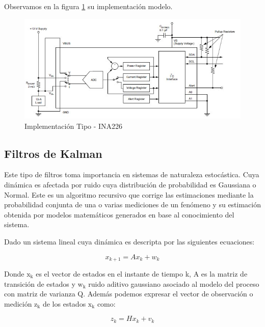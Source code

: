 \documentclass[10pt,a4paper]{article}
\begin{document}
Observamos en la figura \ref{fig:ina226-commonimplementation} su implementación
modelo. 

\begin{figure}[h!]
    \begin{center}
	\includegraphics[width=0.7\linewidth]{assets/INA226-Common_Implementation}
	\caption{Implementación Tipo - INA226}
	\label{fig:ina226-commonimplementation}
    \end{center}	
\end{figure}
\FloatBarrier

\subsection{Filtros de Kalman}

Este tipo de filtros toma importancia en sistemas de naturaleza estocástica.
Cuya dinámica es afectada por ruido cuya distribución de probabilidad es
Gaussiana o Normal. Este es un algoritmo recursivo que corrige las estimaciones
mediante la probabilidad conjunta de una o varias mediciones de un fenómeno y su
estimación obtenida por modelos matemáticos generados en base al conocimiento
del sistema.

Dado un sistema lineal cuya dinámica es descripta por las siguientes ecuaciones:

\begin{equation}
    x_{k+1}= Ax_{k} + w_{k}
    \label{KF_equation01}
\end{equation}	

\noindent Donde $\mathrm{x_{k}}$ es el vector de estados en el instante de 
tiempo k, A es la matriz de transición de estados y $\mathrm{w_{k}}$ ruido 
aditivo gaussiano asociado al modelo del proceso con matriz de varianza Q. 
Además podemos expresar el vector de observación o medición $\mathrm{z_{k}}$ 
de los estados $\mathrm{x_{k}}$ como:

\begin{equation}
    z_{k}= Hx_{k} + v_{k}
    \label{KF_equation02}
\end{equation}	
\end{document}
